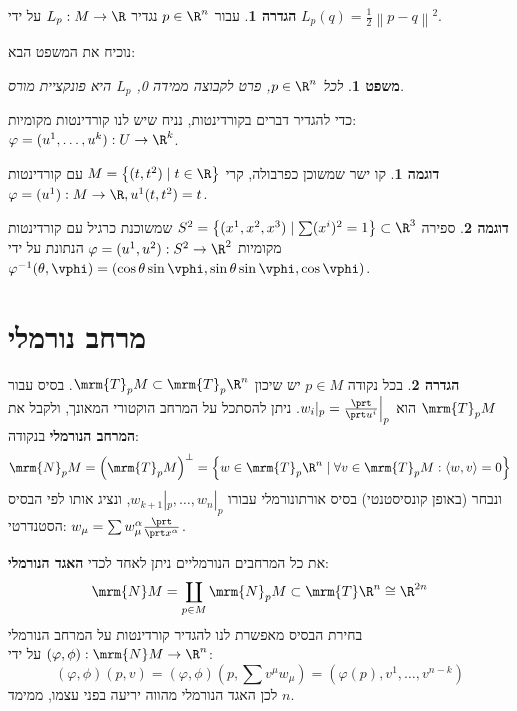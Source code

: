 \documentclass{article}
\newtheorem*{theorem*}{משפט}
\theoremstyle{definition}
\newtheorem*{definition*}{הגדרה}
\newtheorem*{example*}{דוגמה}
\newcommand{\norm}[1]{\left\lVert#1\right\rVert}
\begin{document}
	\begin{definition*}
		עבור
		\(p\in \R^n\)
		נגדיר
		\(L_p:M\to \R\)
		על ידי
		\(L_p(q)=\frac{1}{2}\norm{p-q}^2\).
	\end{definition*}

	נוכיח את המשפט הבא:
	\begin{theorem*}
		לכל
		\(p\in \R^n\),
		פרט לקבוצה ממידה 0, \(L_p\) היא פונקציית מורס.
	\end{theorem*}

	כדי להגדיר דברים בקורדינטות, נניח שיש לנו קורדינטות מקומיות:
	\(\varphi=(u^1,\dotsc,u^k): U \to \R^k\).
	
	\begin{example*}
		קו ישר שמשוכן כפרבולה, קרי
		\(M = \left\{ (t,t^2)\mid t \in \R \right\}\)
		עם קורדינטות
		\(\varphi=(u^1): M \to \R, u^1(t,t^2)=t\).
	\end{example*}
	
	\begin{example*}
		ספירה
		\(S^2 = \left\{(x^1,x^2,x^3) \mid \sum (x^i)^2 = 1 \right\} \subset \R^3 \)
		שמשוכנת כרגיל עם קורדינטות מקומיות
		\(\varphi=(u^1,u^2): S^2 \to \R^2\)
		הנתונת על ידי
		\(
			\varphi^{-1}(\theta, \vphi) = \left(
				\cos\theta \sin\vphi,
				\sin\theta \sin\vphi,
				\cos\vphi
			\right)
		\).
	\end{example*}




	\section{מרחב נורמלי}
	
	\begin{definition*}
		בכל נקודה
		$p\in M$
		יש שיכון
		\(\mrm{T}_p M \subset \mrm{T}_p \R^n\).
		בסיס עבור
		\(\mrm{T}_p M\)
		הוא
		\(w_i|_p=\frac{\prt}{\prt u^i}\Big|_p\).
		ניתן להסתכל על המרחב הוקטורי המאונך, ולקבל את \textbf{המרחב הנורמלי} בנקודה:
		\[
			\mrm{N}_p M
			= \left(\mrm{T}_p M\right)^\bot
			= \left\{
				w \in \mrm{T}_p \R^n
				\mid
				\forall v \in \mrm{T}_p M: \langle w,v \rangle=0
			\right\}
		\]
		ונבחר (באופן קונסיסטנטי) בסיס אורתונורמלי עבורו
		\(w_{k+1}|_p,\dotsc,w_{n}|_p\),
		ונציג אותו לפי הבסיס הסטנדרטי:
		\(w_\mu = \sum w^\alpha_\mu \frac{\prt}{\prt x^\alpha}\).
		
		את כל המרחבים הנורמליים ניתן לאחד לכדי \textbf{האגד הנורמלי}:
		\[
			\mrm{N} M
			= \coprod_{p \in M} \mrm{N}_p M
			\subset \mrm{T} \R^n
			\cong \R^{2n}
		\]
		בחירת הבסיס מאפשרת לנו להגדיר קורדינטות על המרחב הנורמלי
		\((\varphi,\phi): \mrm{N} M \to \R^n\)
		על ידי:
		\[
			(\varphi,\phi)(p,v)
			= (\varphi,\phi)(p,\sum v^\mu w_\mu)
			= (\varphi(p),v^1,\dotsc,v^{n-k})
		\]
		לכן האגד הנורמלי מהווה יריעה בפני עצמו, ממימד \(n\).
	\end{definition*}
\end{document}
